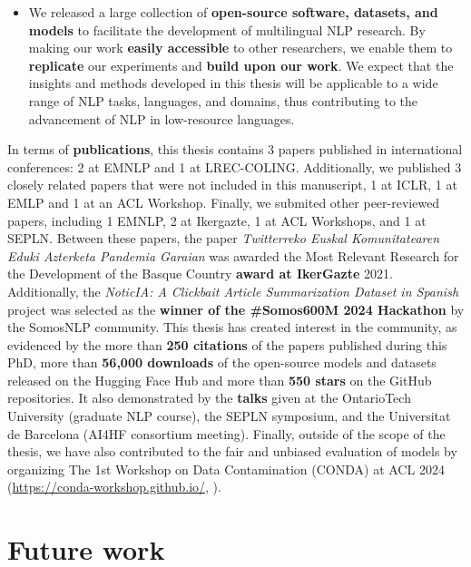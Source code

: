 \begin{itemize}
    \item We released a large collection of \textbf{open-source software, datasets, and models} to facilitate the development of multilingual NLP research. By making our work \textbf{easily accessible} to other researchers, we enable them to \textbf{replicate} our experiments and \textbf{build upon our work}. We expect that the insights and methods developed in this thesis will be applicable to a wide range of NLP tasks, languages, and domains, thus contributing to the advancement of NLP in low-resource languages.
     
\end{itemize}



In terms of \textbf{publications}, this thesis contains 3 papers published in international conferences: 2 at EMNLP and 1 at LREC-COLING. Additionally, we published 3 closely related papers that were not included in this manuscript, 1 at ICLR, 1 at EMLP and 1 at an ACL Workshop. Finally, we submited other peer-reviewed papers, including 1 EMNLP, 2 at Ikergazte, 1 at ACL Workshops, and 1 at SEPLN. Between these papers, the paper \textit{Twitterreko Euskal Komunitatearen Eduki Azterketa Pandemia Garaian} was awarded the Most Relevant Research for the Development of the Basque Country \textbf{award at IkerGazte} 2021. Additionally, the \textit{NoticIA: A Clickbait Article Summarization Dataset in Spanish} project was selected as the \textbf{winner of the \#Somos600M 2024 Hackathon} by the SomosNLP community. This thesis has created interest in the community, as evidenced by the more than  \textbf{250 citations} of the papers published during this PhD, more than  \textbf{56,000 downloads} of the open-source models and datasets released on the Hugging Face Hub and more than  \textbf{550 stars} on the GitHub repositories. It also demonstrated by the  \textbf{talks} given at the OntarioTech University (graduate NLP course), the SEPLN symposium, and the Universitat de Barcelona (AI4HF consortium meeting).  
Finally, outside of the scope of the thesis, we have also contributed to the fair and unbiased evaluation of models by organizing The 1st Workshop on Data Contamination (CONDA) at ACL 2024 (\href{https://conda-workshop.github.io/}{https://conda-workshop.github.io/}, \cite{sainz-etal-2024-data}).

\section{Future work}

